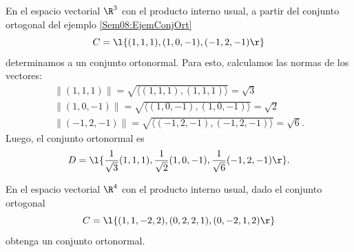 \documentclass[compacto,10pt]{pubciencias-notas}
\begin{document}
\begin{ejem}\hspace{0pt}\label{ConjuntoOrtonormal} En el espacio vectorial $\R^{3}$ con el producto interno usual, a partir del conjunto ortogonal del ejemplo \ref{Sem08:EjemConjOrt} 
\[
    C = \l\{(1,1,1), (1,0,-1), (-1,2,-1)\r\}
\]
determinamos a un conjunto ortonormal. Para esto, calculamos las normas de los vectores:
\[
\begin{array}{l}
    \|(1,1,1)\| = \sqrt{\langle (1,1,1), (1,1,1)\rangle } = \sqrt{3}\\
    \|(1,0,-1)\| = \sqrt{\langle (1,0,-1), (1,0,-1)\rangle } = \sqrt{2}\\
    \|(-1,2,-1)\| = \sqrt{\langle (-1,2,-1), (-1,2,-1)\rangle } = \sqrt{6}.
\end{array}
\]
Luego, el conjunto ortonormal es
\[
    D = \l\{\dfrac{1}{\sqrt{3}}(1,1,1), \dfrac{1}{\sqrt{2}}(1,0,-1), \dfrac{1}{\sqrt{6}}(-1,2,-1)\r\}.
\]
\end{ejem}

\begin{ejer}\hspace{0pt} En el espacio vectorial $\R^{4}$ con el producto interno usual, dado el conjunto ortogonal
\[
    C = \l\{(1,1,-2,2), (0,2,2,1), (0,-2,1,2)\r\}
\]
obtenga un conjunto ortonormal.
\end{ejer}


\end{document}
